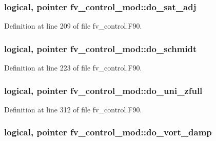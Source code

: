 \subsubsection[{do\-\_\-sat\-\_\-adj}]{\setlength{\rightskip}{0pt plus 5cm}logical, pointer fv\-\_\-control\-\_\-mod\-::do\-\_\-sat\-\_\-adj\hspace{0.3cm}{\ttfamily [private]}}\label{classfv__control__mod_a0abb7b731ab56c18f0ad1d1e19867c2a}


Definition at line 209 of file fv\-\_\-control.\-F90.

\subsubsection[{do\-\_\-schmidt}]{\setlength{\rightskip}{0pt plus 5cm}logical, pointer fv\-\_\-control\-\_\-mod\-::do\-\_\-schmidt\hspace{0.3cm}{\ttfamily [private]}}\label{classfv__control__mod_a7c583929b563afebe8c3928541715f28}


Definition at line 223 of file fv\-\_\-control.\-F90.

\subsubsection[{do\-\_\-uni\-\_\-zfull}]{\setlength{\rightskip}{0pt plus 5cm}logical, pointer fv\-\_\-control\-\_\-mod\-::do\-\_\-uni\-\_\-zfull\hspace{0.3cm}{\ttfamily [private]}}\label{classfv__control__mod_a0177940eab03249d9b347df15e5022bc}


Definition at line 312 of file fv\-\_\-control.\-F90.

\subsubsection[{do\-\_\-vort\-\_\-damp}]{\setlength{\rightskip}{0pt plus 5cm}logical, pointer fv\-\_\-control\-\_\-mod\-::do\-\_\-vort\-\_\-damp\hspace{0.3cm}{\ttfamily [private]}}\label{classfv__control__mod_af67a5101144aa261557a851a6d696f71}


